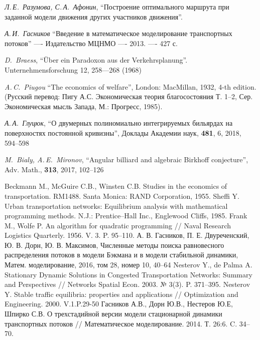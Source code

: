 \documentclass[12pt, a4paper]{article}
\begin{document}
    \newpage
\begin{thebibliography}{0}
	
	
	 \textit{Л.\,Е.~Разумова, С.\,А.~Афонин}, ``Построение оптимального маршрута при заданной модели движения других участников движения''.
	
	 \textit{А.\,И.~Гасников} ``Введение в математическое моделирование транспортных потоков'' —- Издательство МЦНМО —- 2013. —- 427 с.
	
	 \textit{D.~Braess}, ``Über ein Paradoxon aus der Verkehrsplanung''. Unternehmensforschung 12, 258—268 (1968)
	
	 \textit{A.\,C.~Piugou} ``The economics of welfare'', London: MacMillan, 1932,
	4-th edition. (Русский перевод: Пигу А.С. Экономическая теория благосостояния Т. 1–2, Сер. Экономическая мысль Запада,
	М.: Прогресс, 1985).
	
	 \textit{А.\,А.~Глуцюк}, ``О двумерных полиномиально интегрируемых бильярдах на поверхностях постоянной кривизны'', Доклады Академии наук, \textbf{481}, 6, 2018, 594--598
	
	 \textit{M.~Bialy, A.\,E.~Mironov}, ``Angular billiard and algebraic Birkhoff conjecture'', Adv. Math., \textbf{313}, 2017, 102--126
	
	 Beckmann M., McGuire C.B., Winsten C.B. Studies in the economics of transportation. RM1488. Santa Monica: RAND Corporation, 1955.
	 Sheffi Y. Urban transportation networks: Equilibrium analysis with mathematical programming methods. N.J.: Prentice–Hall Inc., Englewood Cliffs, 1985.
	 Frank M., Wolfe P. An algorithm for quadratic programming //
	Naval Research Logistics Quarterly. 1956. V. 3. P. 95–110.
	 А. В. Гасников, П. Е. Двуреченский, Ю. В. Дорн, Ю. В. Максимов, Численные методы поиска равновесного распределения потоков в модели Бэкмана и в модели стабильной динамики, Матем. моделирование, 2016, том 28, номер 10, 40–64
	 Nesterov Y., de Palma A. Stationary Dynamic Solutions in Congested Transportation Networks: Summary and Perspectives // Networks Spatial Econ. 2003. № 3(3). P. 371–395.
	 Nesterov Y. Stable traffic equilibria: properties and applications // Optimization and Engineering. 2000. V.1.P.29-50
	 Гасников А.В., Дорн Ю.В., Нестеров Ю.Е, Шпирко С.В. О трехстадийной версии модели
	стационарной динамики транспортных потоков // Математическое моделирование. 2014. Т. 26:6. C. 34–70.
	\fi
	
\end{thebibliography} 
\end{document}
